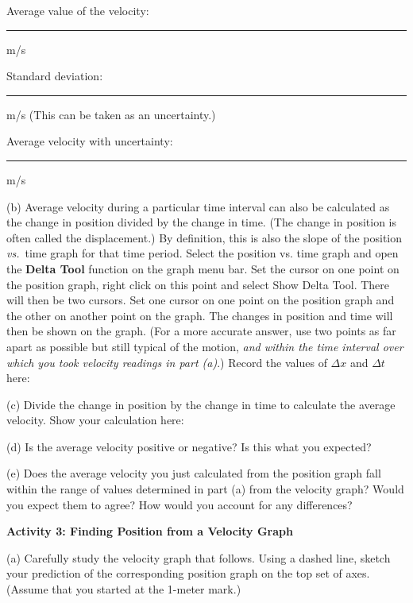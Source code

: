 \answerspace{5mm}

Average value of the velocity: \rule{1.0in}{0.1pt} m/s

Standard deviation: \rule{1.0in}{0.1pt} m/s     (This can be taken as an uncertainty.)

Average velocity with uncertainty: \rule{1.5in}{0.1pt} m/s

(b) Average velocity during a particular time interval can also be calculated
as the change in position divided by the change in time. (The change in position
is often called the displacement.) By definition, this is also the slope of
the position \textit{vs.}~time graph for that time period. Select the position vs. time graph and open the \textbf{Delta Tool} function on the graph menu bar.  Set the cursor on one point on the position graph, right click on this point and select Show Delta Tool.  There will then be two cursors.  Set one cursor on one point on the position graph and the other on another point on the graph.  The changes in position and time will then be shown on the graph. (For a more accurate answer, use two points as far apart
as possible but still typical of the motion, \emph{and within the time 
interval over which you took velocity readings in part (a)}.) 
Record the values of \( \Delta x\) and \( \Delta t\) here:
\answerspace{10mm}

(c) Divide the change in position by the change in time to calculate the average velocity.  Show your calculation here:
\answerspace{15mm}

(d) Is the average velocity positive or negative? Is this what you expected? 
\answerspace{15mm}

\pagebreak[2]
(e) Does the average velocity you just calculated from the position graph fall within the range of values determined in part (a) from the velocity graph? Would you expect them to agree? How would you account for any differences?
\vspace{20mm}

\textbf{Activity 3: Finding Position from a Velocity Graph }

(a) Carefully study the velocity graph that follows. Using a dashed line, sketch your prediction of the corresponding position graph on the top set of axes.
(Assume that you started at the 1-meter mark.)

